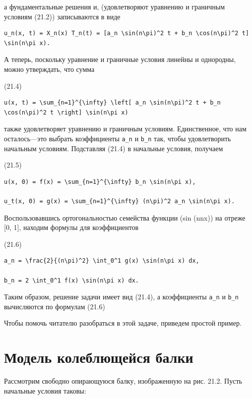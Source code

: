 \documentclass[
  ukrainian,
]{article}
\begin{document}
а фундаментальные решения и, (удовлетворяют уравнению и граничным
условиям (21.2)) записываются в виде

\begin{verbatim}
u_n(x, t) = X_n(x) T_n(t) = [a_n \sin(n\pi)^2 t + b_n \cos(n\pi)^2 t] \sin(n\pi x).
\end{verbatim}

А теперь, поскольку уравнение и граничные условия линейны и однородны,
можно утверждать, что сумма

(21.4)

\begin{verbatim}
u(x, t) = \sum_{n=1}^{\infty} \left[ a_n \sin(n\pi)^2 t + b_n \cos(n\pi)^2 t \right] \sin(n\pi x)
\end{verbatim}

также удовлетворяет уравнению и граничным условиям. Единственное, что
нам осталось---это выбрать коэффициенты \texttt{a\_n} и \texttt{b\_n}
так, чтобы удовлетворить начальным условиям. Подставляя (21.4) в
начальные условия, получаем

(21.5)

\begin{verbatim}
u(x, 0) = f(x) = \sum_{n=1}^{\infty} b_n \sin(n\pi x),

u_t(x, 0) = g(x) = \sum_{n=1}^{\infty} (n\pi)^2 a_n \sin(n\pi x).
\end{verbatim}

Воспользовавшись ортогональностью семейства функции (sin (nnx)) на
отреже {[}0, 1{]}, находим формулы для коэффициентов

(21.6)

\begin{verbatim}
a_n = \frac{2}{(n\pi)^2} \int_0^1 g(x) \sin(n\pi x) dx,

b_n = 2 \int_0^1 f(x) \sin(n\pi x) dx.
\end{verbatim}

Таким образом, решение задачи имеет вид (21.4), а коэффициенты
\texttt{a\_n} и \texttt{b\_n} вычисляются по формулам (21.6)

Чтобы помочь читателю разобраться в этой задаче, приведем простой
пример.

\section{Модель колеблющейся
балки}\label{ux43cux43eux434ux435ux43bux44c-ux43aux43eux43bux435ux431ux43bux44eux449ux435ux439ux441ux44f-ux431ux430ux43bux43aux438}

Рассмотрим свободно опирающуюся балку, изображенную на рис. 21.2. Пусть
начальные условия таковы:
\end{document}
